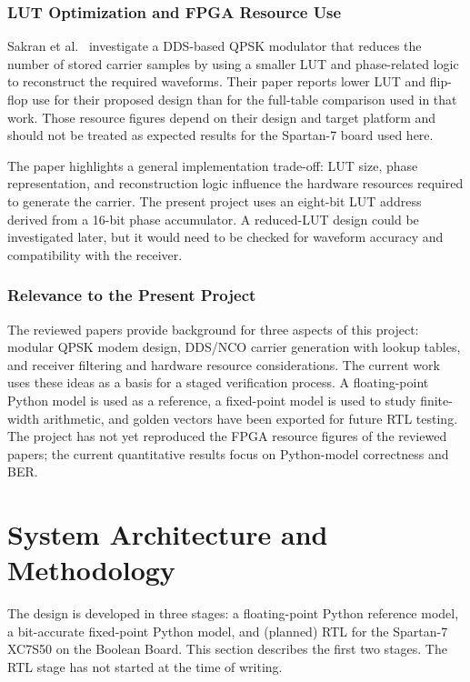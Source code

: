 \documentclass[10pt,twocolumn,letterpaper]{article}
\newcommand{\newstart}{\begingroup\color{blue}}
\newcommand{\newend}{\endgroup}
\begin{document}
\subsubsection{LUT Optimization and FPGA Resource Use}
Sakran et al.~\cite{sakran2025qpsk} investigate a DDS-based QPSK modulator that reduces the number of stored carrier samples by using a smaller LUT and phase-related logic to reconstruct the required waveforms. Their paper reports lower LUT and flip-flop use for their proposed design than for the full-table comparison used in that work. Those resource figures depend on their design and target platform and should not be treated as expected results for the Spartan-7 board used here.

The paper highlights a general implementation trade-off: LUT size, phase representation, and reconstruction logic influence the hardware resources required to generate the carrier. The present project uses an eight-bit LUT address derived from a 16-bit phase accumulator. A reduced-LUT design could be investigated later, but it would need to be checked for waveform accuracy and compatibility with the receiver.

\subsubsection{Relevance to the Present Project}
The reviewed papers provide background for three aspects of this project: modular QPSK modem design, DDS/NCO carrier generation with lookup tables, and receiver filtering and hardware resource considerations. The current work uses these ideas as a basis for a staged verification process. A floating-point Python model is used as a reference, a fixed-point model is used to study finite-width arithmetic, and golden vectors have been exported for future RTL testing. The project has not yet reproduced the FPGA resource figures of the reviewed papers; the current quantitative results focus on Python-model correctness and BER.
\newend

\newstart
\section{System Architecture and Methodology}
\label{sec:method}

The design is developed in three stages: a floating-point Python reference
model, a bit-accurate fixed-point Python model, and (planned) RTL for the
Spartan-7 XC7S50 on the Boolean Board. This section describes the first two
stages. The RTL stage has not started at the time of writing.
\end{document}
